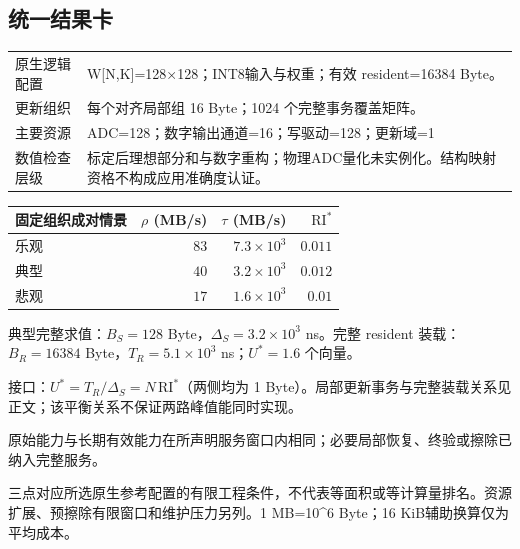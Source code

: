 \subsection*{统一结果卡}
\begingroup\small
\noindent\begin{tabularx}{\textwidth}{@{}p{24mm}X@{}}\toprule
原生逻辑配置 & W[N,K]=128×128；INT8输入与权重；有效 resident=16384 Byte。\\
更新组织 & 每个对齐局部组 16 Byte；1024 个完整事务覆盖矩阵。\\
主要资源 & ADC=128；数字输出通道=16；写驱动=128；更新域=1\\
数值检查层级 & 标定后理想部分和与数字重构；物理ADC量化未实例化。结构映射资格不构成应用准确度认证。\\
\bottomrule\end{tabularx}
\vspace{3mm}
\begin{center}\begin{tabular}{@{}lrrr@{}}\toprule
固定组织成对情景 & $\rho$ (MB/s) & $\tau$ (MB/s) & $\mathrm{RI}^{*}$\\\midrule
乐观 & $83$ & $7.3\times10^{3}$ & $0.011$\\
典型 & $40$ & $3.2\times10^{3}$ & $0.012$\\
悲观 & $17$ & $1.6\times10^{3}$ & $0.01$\\
\bottomrule\end{tabular}\end{center}
\noindent 典型完整求值：$B_S=128$ Byte，$\Delta_S=3.2\times10^{3}$ ns。完整 resident 装载：$B_R=16384$ Byte，$T_R=5.1\times10^{3}$ ns；$U^*=1.6$ 个向量。
\par\smallskip\noindent 接口：$U^*=T_R/\Delta_S=N\,\mathrm{RI}^*$（两侧均为 1 Byte）。局部更新事务与完整装载关系见正文；该平衡关系不保证两路峰值能同时实现。
\par\smallskip\noindent 原始能力与长期有效能力在所声明服务窗口内相同；必要局部恢复、终验或擦除已纳入完整服务。
\par\smallskip\noindent 三点对应所选原生参考配置的有限工程条件，不代表等面积或等计算量排名。资源扩展、预擦除有限窗口和维护压力另列。1 MB=10\textasciicircum{}6 Byte；16 KiB辅助换算仅为平均成本。
\endgroup
\clearpage
